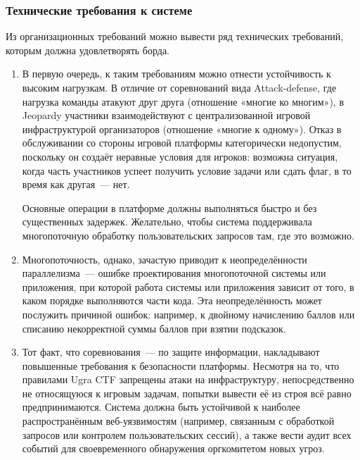 \subsubsection{Технические требования к системе}
\label{cha:the:board:tech}

Из организационных требований можно вывести ряд технических требований, которым должна удовлетворять борда.

\begin{enumerate}

\item
В первую очередь, к таким требованиям можно отнести устойчивость к высоким нагрузкам. В отличие от соревнований вида Attack-defense, где нагрузка команды атакуют друг друга (отношение «многие ко многим»), в Jeopardy участники взаимодействуют с централизованной игровой инфраструктурой организаторов (отношение «многие к одному»). Отказ в обслуживании со стороны игровой платформы категорически недопустим, поскольку он создаёт неравные условия для игроков: возможна ситуация, когда часть участников успеет получить условие задачи или сдать флаг, в то время как другая~--- нет.

Основные операции в платформе должны выполняться быстро и без существенных задержек. Желательно, чтобы система поддерживала многопоточную обработку пользовательских запросов там, где это возможно.

\item
Многопоточность, однако, зачастую приводит к неопределённости параллелизма~--- ошибке проектирования многопоточной системы или приложения, при которой работа системы или приложения зависит от того, в каком порядке выполняются части кода. Эта неопределённость может послужить причиной ошибок: например, к двойному начислению баллов или списанию некорректной суммы баллов при взятии подсказок.


\item
Тот факт, что соревнования~--- по защите информации, накладывают повышенные требования к безопасности платформы. Несмотря на то, что правилами Ugra CTF запрещены атаки на инфраструктуру, непосредственно не относящуюся к игровым задачам, попытки вывести её из строя всё равно предпринимаются. Система должна быть устойчивой к наиболее распространённым веб-уязвимостям (например, связанным с обработкой запросов или контролем пользовательских сессий), а также вести аудит всех событий для своевременного обнаружения оргкомитетом новых угроз.
\end{enumerate}


